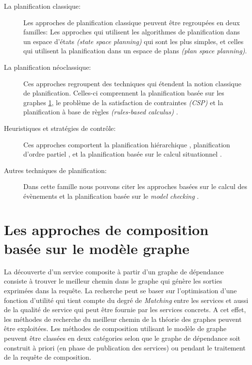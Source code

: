   \renewcommand{\descriptionlabel}[1]{\hspace{0.5cm}\textbullet~\textsf{#1}}
  \begin{description}
  \item [La planification classique:] Les approches de planification
    classique \cite{akkiraju2004executing, zeng2008dynamic} peuvent
    être regroupées en deux familles: Les approches qui
    utilisent les algorithmes de planification dans un espace d'états
    \textit{(state space planning)} qui sont les plus simples, et celles
    qui utilisent la planification dans un espace de plans \textit{(plan space planning)}.

  \item [La planification néoclassique:] Ces approches regroupent des
    techniques qui étendent la notion classique de
    planification. Celles-ci comprennent la planification basée sur les
    graphes \ref{sec:graph-base-composition}, le problème de la
    satisfaction de contraintes \textit{(CSP)}
    \cite{paik2007automatic} et la planification à base de règles
    \textit{(rules-based calculus)} \cite{medjahed2004semantic,
      rao2006mixed}.

  \item [Heuristiques et stratégies de contrôle:] Ces approches
    comportent la planification hiérarchique \cite{wu2003automating,
      sirin2004htn}, planification d'ordre partiel \cite{peer2005pop,
      klusch2005semantic}, et la planification basée sur le calcul
    situationnel \cite{mcilraith2002adapting, sohrabi2009web}.

  \item [Autres techniques de planification:] Dans cette famille nous
    pouvons citer les approches basées sur le calcul des évènements
    \cite{aydin2008automated} et la planification basée sur le
    \textit{model checking}
    \cite{pistore2004planning,pistore2005automated}.
  \end{description}
  \enddescription

  \section{Les approches de composition basée sur le modèle graphe}
  \label{sec:graph-base-composition}

  La découverte d'un service composite à partir d'un graphe de
  dépendance consiste à trouver le meilleur chemin dans le graphe qui
  génère les sorties exprimées dans la requête. La recherche peut se
  baser sur l'optimisation d'une fonction d'utilité qui tient compte
  du degré de \textit{Matching} entre les services et aussi de la qualité de
  service qui peut être fournie par les services concrets. A cet
  effet, les méthodes de recherche du meilleur chemin de la théorie
  des graphes peuvent être exploitées.  Les méthodes de composition
  utilisant le modèle de graphe peuvent être classées en deux
  catégories selon que le graphe de dépendance soit construit à priori
  (en phase de publication des services) ou pendant le traitement de
  la requête de composition.

